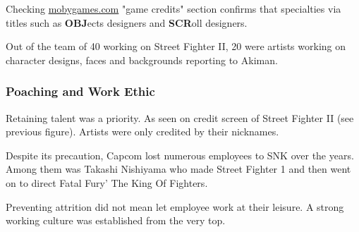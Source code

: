 
\begin{trivia}
Checking \url{mobygames.com} "game credits" section confirms that specialties via titles such as \textbf{OBJ}ects designers and \textbf{SCR}oll designers.
\end{trivia}

Out of the team of 40 working on Street Fighter II, 20 were artists working on character designs, faces and backgrounds reporting to Akiman\cite{sf2_oral_history}.



\subsubsection{Poaching and Work Ethic}
Retaining talent was a priority. As seen on credit screen of Street Fighter II (see previous figure). Artists were only credited by their nicknames.

Despite its precaution, Capcom lost numerous employees to SNK over the years. Among them was Takashi Nishiyama who made Street Fighter 1 and then went on to direct Fatal Fury' The King Of Fighters\cite{YoshikiOkamotoTakashiNishiyama}.
 




Preventing attrition did not mean let employee work at their leisure. A strong working culture was established from the very top.

